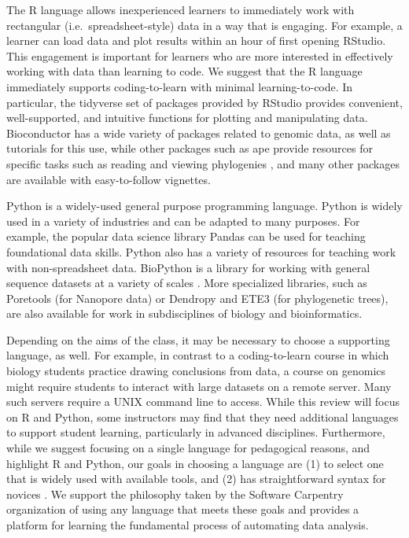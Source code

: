 The R language allows inexperienced learners to immediately work with rectangular (i.e.\ spreadsheet-style) data in a way that is engaging. 
For example, a learner can load data and plot results within an hour of first opening RStudio. 
This engagement is important for learners who are more interested in effectively working with data than learning to code. We suggest that the R language immediately supports coding-to-learn with minimal learning-to-code.
In particular, the tidyverse set of packages provided by RStudio provides 
convenient, well-supported, and intuitive functions for plotting and manipulating data.
Bioconductor \citep{bioconductor} has a wide variety of packages related to genomic data, as well as tutorials for this use, while other packages such as ape \citep{ape} 
provide resources for specific tasks such as reading and viewing phylogenies ,
and many other packages are available with easy-to-follow vignettes.

Python is a widely-used general purpose programming language.
Python is widely used in a variety of industries %
and can be adapted to many purposes. 
For example, the popular data science library Pandas \citep{pandas} can be used for teaching foundational data skills.
Python also has a variety of resources for teaching work with non-spreadsheet data.
BioPython is a library for working with general sequence datasets at a variety of scales \citep{biopython}. 
More specialized libraries, such as Poretools \citep{poretools} (for Nanopore data) or Dendropy \citep{dendropy} and ETE3 \citep{ete3} (for phylogenetic trees), are also available for work in subdisciplines of biology and bioinformatics.

Depending on the aims of the class, it may be necessary to choose a supporting language, as well.
For example, in contrast to a coding-to-learn course in which biology students practice drawing conclusions from data, a course on genomics might require students to interact with large datasets on a remote server.
Many such servers require a UNIX command line to access.
While this review will focus on R and Python, some instructors may find that they need additional languages to support student learning, particularly in advanced disciplines.
Furthermore, while we suggest focusing on a single language for pedagogical reasons,
and highlight R and Python,
our goals in choosing a language are 
(1) to select one that is widely used with available tools, and
(2) has straightforward syntax for novices \citep{stefik}.
We support the philosophy taken by the Software Carpentry organization of
using any language that meets these goals and provides a platform for learning
the fundamental process of automating data analysis.

